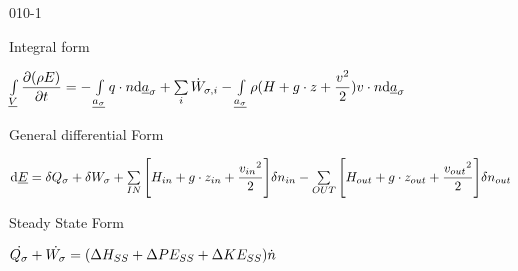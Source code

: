 \begin{mitframe}{010-1}


	\begin{listone}
	
    \item Integral form

	\item $\int\limits_{\uline{\vol}}\dfrac{\partial(\dens\energy)}{\partial\timet}=-\int\limits_{\uline{\activity_{\molecrad}}}\heatflux\cdot n \mathrm{d}\uline{\activity}_{\molecrad} +\sum\limits_{i}\dot{\work}_{\molecrad,\state}-\int\limits_{\uline{\activity_{\molecrad}}}\dens(\enthalpy+\grav\cdot \heightz+\dfrac{\vvel^{2}}{2})\vvel\cdot n \mathrm{d}\uline{\activity}_{\molecrad}$
	
    \item General differential Form
    
    \item $\mathrm{d}\uline{\energy}=\blthick\heatflow_{\molecrad}+\blthick\work_{\molecrad}+\sum\limits_{IN}\Bigg[\enthalpy_{in}+\grav\cdot\heightz_{in}+\dfrac{{\vvel_{in}}^{2}}{2}\Bigg]\blthick n_{in}-\sum\limits_{OUT}\Bigg[\enthalpy_{out}+\grav\cdot\heightz_{out}+\dfrac{{\vvel_{out}}^{2}}{2}\Bigg]\blthick n_{out}$
    
    \item Steady State Form
    
    \item $\dot{\heatflow_{\molecrad}}+\dot{\work_{\molecrad}}=(\iipf\enthalpy_{SS}+\iipf\p\energy_{SS}+\iipf\taylordisp\energy_{SS})\dot{n}$
    
	\end{listone}
    
\end{mitframe}